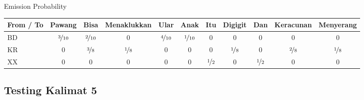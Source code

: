 \documentclass[paper=a4, fontsize=11pt]{scrartcl} %
\numberwithin{equation}{section} %
\numberwithin{figure}{section} %
\numberwithin{table}{section} %
\begin{document}
Emission Probability \\
\begin{tabular}{ | l | c | c | c | c | c | c | c | c | c | c |}
	\hline
	From / To & Pawang & Bisa & {\tiny Menaklukkan} & Ular & Anak & Itu & {\tiny Digigit} & Dan & {\tiny Keracunan} & {\tiny Menyerang} \\ \hline
	BD & $\nicefrac{3}{10}$ & $\nicefrac{2}{10}$ & 0 & $\nicefrac{4}{10}$ & $\nicefrac{1}{10}$ & 0 & 0 & 0 & 0 & 0 \\ \hline
	KR & 0 & $\nicefrac{3}{8}$ & $\nicefrac{1}{8}$ & 0 & 0 & 0 & $\nicefrac{1}{8}$ & 0 & $\nicefrac{2}{8}$ & $\nicefrac{1}{8}$ \\ \hline
	XX & 0 & 0 & 0 & 0 & 0 & $\nicefrac{1}{2}$ & 0 & $\nicefrac{1}{2}$ & 0 & 0 \\ \hline
\end{tabular}

\subsection{Testing Kalimat 5}
\end{document}
